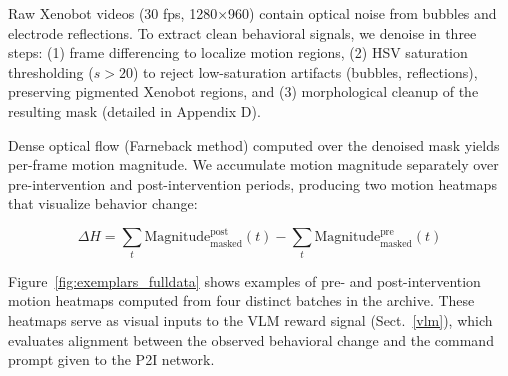 \documentclass{article}
\begin{document}
Raw Xenobot videos (30 fps, 1280×960) contain optical noise from bubbles and electrode reflections. To extract clean behavioral signals, we denoise in three steps: (1) frame differencing to localize motion regions, (2) HSV saturation thresholding ($s > 20$) to reject low-saturation artifacts (bubbles, reflections), preserving pigmented Xenobot regions, and (3) morphological cleanup of the resulting mask (detailed in Appendix D).

Dense optical flow (Farneback method) computed over the denoised mask yields per-frame motion magnitude. We accumulate motion magnitude separately over pre-intervention and post-intervention periods, producing two motion heatmaps that visualize behavior change:

\begin{equation}
\label{eq:delta_h}
\Delta H = \sum_t \text{Magnitude}_{\text{masked}}^{\text{post}}(t) - \sum_t \text{Magnitude}_{\text{masked}}^{\text{pre}}(t)
\end{equation}

Figure~\ref{fig:exemplars_fulldata} shows examples of pre- and post-intervention motion heatmaps computed from four distinct batches in the archive. These heatmaps serve as visual inputs to the VLM reward signal (Sect.~\ref{vlm}), which evaluates alignment between the observed behavioral change and the command prompt given to the P2I network.
\end{document}
